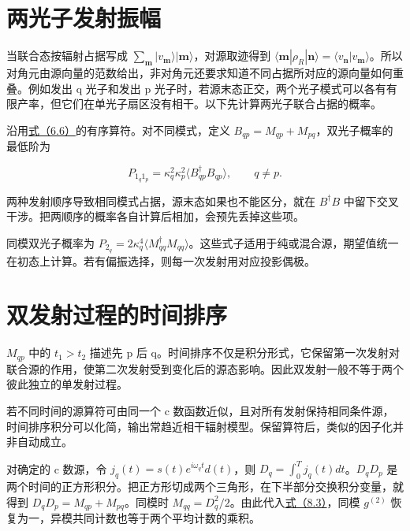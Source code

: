 \documentclass[UTF8,a4paper,zihao=-4,openany,fontset=fandol]{ctexbook}
\begin{document}
\section{两光子发射振幅}\label{sec:08:2}


当联合态按辐射占据写成 $\sum_{\mathbf m}|v_{\mathbf m}\rangle|\mathbf m\rangle$，对源取迹得到 $\langle\mathbf m|\rho_R|\mathbf n\rangle=\langle v_{\mathbf n}|v_{\mathbf m}\rangle$。所以对角元由源向量的范数给出，非对角元还要求知道不同占据所对应的源向量如何重叠。例如发出 q 光子和发出 p 光子时，若源末态正交，两个光子模式可以各有有限产率，但它们在单光子扇区没有相干。以下先计算两光子联合占据的概率。



沿用\hyperref[eq:6.6]{式（6.6）}的有序算符。对不同模式，定义 $B_{qp}=M_{qp}+M_{pq}$，双光子概率的最低阶为



\begin{equation*}
P_{1_q1_p}=\kappa_q^2\kappa_p^2
\langle B_{qp}^\dagger B_{qp}\rangle,\qquad q\ne p.
\tag{8.1}\label{eq:8.1}
\end{equation*}


两种发射顺序导致相同模式占据，源末态如果也不能区分，就在 $B^\dagger B$ 中留下交叉干涉。把两顺序的概率各自计算后相加，会预先丢掉这些项。



同模双光子概率为 $P_{2_q}=2\kappa_q^4\langle M_{qq}^\dagger M_{qq}\rangle$。这些式子适用于纯或混合源，期望值统一在初态上计算。若有偏振选择，则每一次发射用对应投影偶极。



\section{双发射过程的时间排序}\label{sec:08:3}


$M_{qp}$ 中的 $t_1>t_2$ 描述先 p 后 q。时间排序不仅是积分形式，它保留第一次发射对联合源的作用，使第二次发射受到变化后的源态影响。因此双发射一般不等于两个彼此独立的单发射过程。



若不同时间的源算符可由同一个 c 数函数近似，且对所有发射保持相同条件源，时间排序积分可以化简，输出常趋近相干辐射模型。保留算符后，类似的因子化并非自动成立。



对确定的 c 数源，令 $j_q(t)=s(t)e^{i\omega_qt}d(t)$，则 $D_q=\int_0^T j_q(t)dt$。$D_qD_p$ 是两个时间的正方形积分。把正方形切成两个三角形，在下半部分交换积分变量，就得到 $D_qD_p=M_{qp}+M_{pq}$。同模时 $M_{qq}=D_q^2/2$。由此代入\hyperref[eq:8.3]{式（8.3）}，同模 $g^{(2)}$ 恢复为一，异模共同计数也等于两个平均计数的乘积。
\end{document}
